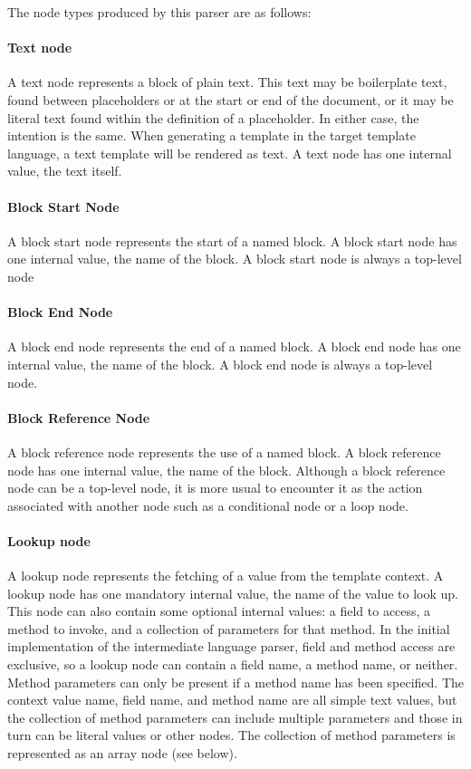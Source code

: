 The node types produced by this parser are as follows:

\paragraph{Text node}

A text node represents a block of plain text. This text may be boilerplate text, found between placeholders or at the start or end of the document, or it may be literal text found within the definition of a placeholder. In either case, the intention is the same. When generating a template in the target template language, a text template will be rendered as text. A text node has one internal value, the text itself.

\paragraph{Block Start Node}

A block start node represents the start of a named block. A block start node has one internal value, the name of the block. A block start node is always a top-level node

\paragraph{Block End Node}

A block end node represents the end of a named block. A block end node has one internal value, the name of the block. A block end node is always a top-level node.

\paragraph{Block Reference Node}

A block reference node represents the use of a named block. A block reference node has one internal value, the name of the block. Although a block reference node can be a top-level node, it is more usual to encounter it as the action associated with another node such as a conditional node or a loop node.

\paragraph{Lookup node}

A lookup node represents the fetching of a value from the template context. A lookup node has one mandatory internal value, the name of the value to look up. This node can also contain some optional internal values: a field to access, a method to invoke, and a collection of parameters for that method. In the initial implementation of the intermediate language parser, field and method access are exclusive, so a lookup node can contain a field name, a method name, or neither. Method parameters can only be present if a method name has been specified. The context value name, field name, and method name are all simple text values, but the collection of method parameters can include multiple parameters and those in turn can be literal values or other nodes. The collection of method parameters is represented as an array node (see below).

